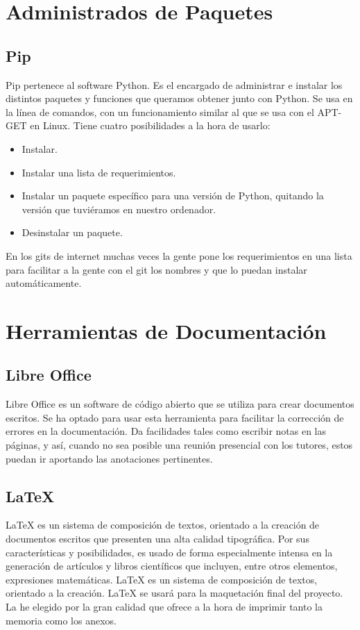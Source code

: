 \section{Administrados de Paquetes}
\subsection{Pip}
Pip pertenece al software Python. Es el encargado de administrar e instalar los distintos paquetes y funciones que queramos obtener junto con Python.
Se usa en la línea de comandos, con un funcionamiento similar al que se usa con el APT-GET en Linux.
Tiene cuatro posibilidades a la hora de usarlo:

\begin{itemize}
    \item Instalar.
    \item Instalar una lista de requerimientos.
    \item Instalar un paquete específico para una versión de Python, quitando la versión que tuviéramos en nuestro ordenador.
    \item Desinstalar un paquete.
\end{itemize}
En los gits de internet muchas veces la gente pone los requerimientos en una lista para facilitar a la gente con el git los nombres y que lo puedan instalar automáticamente.

\section{Herramientas de Documentación}
\subsection{Libre Office}
Libre Office es un software de código abierto que se utiliza para crear documentos escritos. Se ha optado para usar esta herramienta para facilitar la corrección de errores en la documentación. Da facilidades tales como escribir notas en las páginas, y así, cuando no sea posible una reunión presencial con los tutores, estos puedan ir aportando las anotaciones pertinentes.
\subsection{LaTeX}
LaTeX es un sistema de composición de textos, orientado a la creación de documentos escritos que presenten una alta calidad tipográfica. Por sus características y posibilidades, es usado de forma especialmente intensa en la generación de artículos y libros científicos que incluyen, entre otros elementos, expresiones matemáticas. LaTeX es un sistema de composición de textos, orientado a la creación. \cite{latex}
LaTeX se usará para la maquetación final del proyecto. La he elegido por la gran calidad que ofrece a la hora de imprimir tanto la memoria como los anexos.
